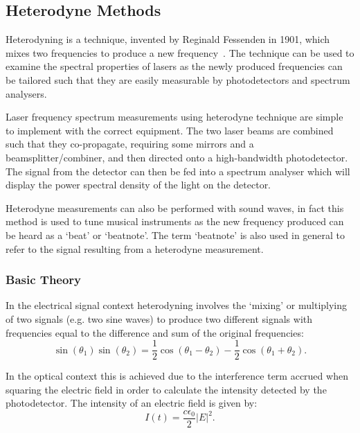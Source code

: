 \subsection{Heterodyne Methods}

Heterodyning is a technique, invented by Reginald Fessenden in 1901, which mixes two frequencies to produce a new frequency~\cite{cooper_physics_2001}.
The technique can be used to examine the spectral properties of lasers as the newly produced frequencies can be tailored such that they are easily measurable by photodetectors and spectrum analysers.

Laser frequency spectrum measurements using heterodyne technique are simple to implement with the correct equipment.
The two laser beams are combined such that they co-propagate, requiring some mirrors and a beamsplitter/combiner, and then directed onto a high-bandwidth photodetector.
The signal from the detector can then be fed into a spectrum analyser which will display the power spectral density of the light on the detector.

Heterodyne measurements can also be performed with sound waves, in fact this method is used to tune musical instruments as the new frequency produced can be heard as a `beat' or `beatnote'.
The term `beatnote' is also used in general to refer to the signal resulting from a heterodyne measurement.

\subsubsection{Basic Theory}
In the electrical signal context heterodyning involves the `mixing' or multiplying of two signals (e.g. two sine waves) to produce two different signals with frequencies equal to the difference and sum of the original frequencies:
\begin{equation}
\sin(\theta_1)\sin(\theta_2) = \frac{1}{2} \cos(\theta_1-\theta_2) - \frac{1}{2} \cos(\theta_1+\theta_2).
\end{equation}

In the optical context this is achieved due to the interference term accrued when squaring the electric field in order to calculate the intensity detected by the photodetector. The intensity of an electric field is given by:
\begin{equation}
I(t) = \frac{c\epsilon_0}{2}|E|^2.
\end{equation}

